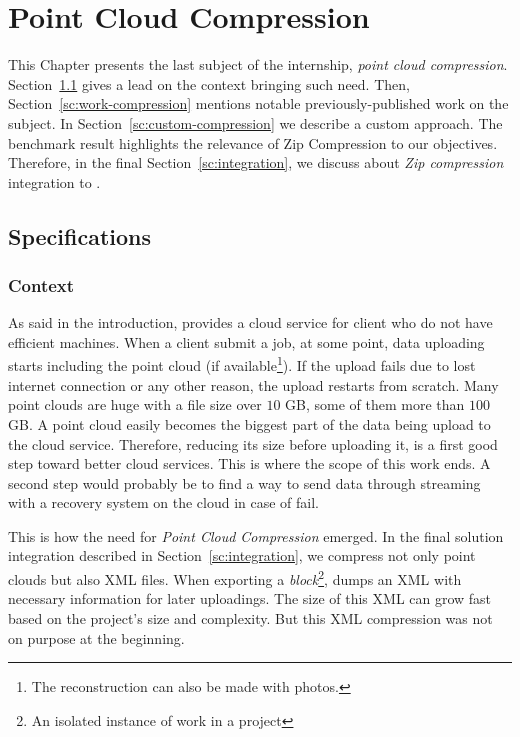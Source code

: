 \chapter{Point Cloud Compression}
\label{ch:compression}
This Chapter presents the last subject of the internship, \emph{point cloud compression}. Section~\ref{sc:spec-compression} gives a lead on the context bringing such need. Then, Section~\ref{sc:work-compression} mentions notable previously-published work on the subject. In Section~\ref{sc:custom-compression} we describe a custom approach. The benchmark result highlights the relevance of Zip Compression to our objectives. Therefore, in the final Section~\ref{sc:integration}, we discuss about \emph{Zip compression} integration to \CC.

\section{Specifications}
\label{sc:spec-compression}

\subsection{Context}
As said in the introduction, \CC provides a cloud service for client who do not have efficient machines. When a client submit a job, at some point, data uploading starts including the point cloud (if available\footnote{The reconstruction can also be made with photos.}). If the upload fails due to lost internet connection or any other reason, the upload restarts from scratch. Many point clouds are huge with a file size over $10$ GB, some of them more than $100$ GB. A point cloud easily becomes the biggest part of the data being upload to the cloud service. Therefore, reducing its size before uploading it, is a first good step toward better cloud services. This is where the scope of this work ends. A second step would probably be to find a way to send data through streaming with a recovery system on the cloud in case of fail.

This is how the need for \emph{Point Cloud Compression} emerged. In the final solution integration described in Section~\ref{sc:integration}, we compress not only point clouds but also XML files. When exporting a \emph{block}\footnote{An isolated instance of work in a \CC project}, \CC dumps an XML with necessary information for later uploadings. The size of this XML can grow fast based on the project's size and complexity. But this XML compression was not on purpose at the beginning.

